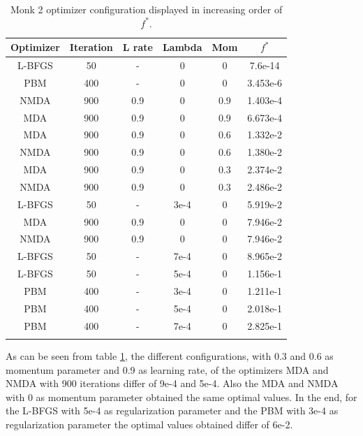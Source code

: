 \begin{longtable}{|c|c|c|c|c|c|}
	\hline
	\centering
	\textbf{Optimizer}&\textbf{Iteration} & \textbf{L rate} & \multicolumn{1}{l|}{\textbf{Lambda}} & \textbf{Mom} & \textbf{$f^{*}$} \\ \hline
	L-BFGS & 50 & - & 0  & 0 & 7.6e-14 \\
	PBM & 400 & - & 0  & 0 & 3.453e-6 \\ 
	NMDA & 900 & 0.9 & 0  & 0.9 & 1.403e-4 \\
	MDA & 900 & 0.9 & 0  & 0.9 & 6.673e-4 \\ 
	MDA & 900 & 0.9 & 0  & 0.6 & 1.332e-2 \\ 
	NMDA & 900 & 0.9 & 0  & 0.6 & 1.380e-2 \\ 
	MDA & 900 & 0.9 & 0  & 0.3 & 2.374e-2  \\ 
	NMDA & 900 & 0.9 & 0  & 0.3 & 2.486e-2 \\ 
	L-BFGS & 50 & - & 3e-4  & 0  & 5.919e-2 \\ 
	MDA & 900 & 0.9 & 0  & 0 & 7.946e-2 \\ 
	NMDA & 900 & 0.9 & 0  & 0 & 7.946e-2 \\ 
	L-BFGS & 50 & - & 7e-4  & 0  & 8.965e-2 \\ 
	L-BFGS & 50 & - & 5e-4  & 0  & 1.156e-1\\ 
	PBM & 400 & - & 3e-4  & 0 & 1.211e-1 \\  
	PBM & 400 & - & 5e-4  & 0 & 2.018e-1 \\ 
	PBM & 400 & - & 7e-4  & 0 & 2.825e-1 \\ 
	\hline
		\caption{Monk 2 optimizer configuration displayed in increasing order of $f^*$.}
	\label{tab:nets_res_plots_Monk2}
\end{longtable}

As can be seen from table \ref{tab:nets_res_plots_Monk2}, the different configurations, with 0.3 and 0.6 as momentum parameter and 0.9 as learning rate, of the optimizers MDA and NMDA with 900 iterations differ of 9e-4 and 5e-4. Also the MDA and NMDA with 0 as momentum parameter obtained the same optimal values. In the end, for the L-BFGS with 5e-4 as regularization parameter and the PBM with 3e-4 as regularization parameter the optimal values obtained differ of 6e-2.  

